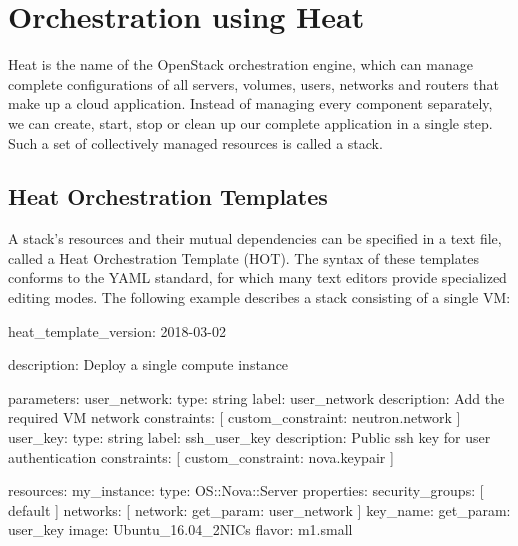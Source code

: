 \chapter{Orchestration using Heat}
\gls{Heat} is the name of the OpenStack orchestration engine, which
can manage complete configurations of all servers, volumes, users,
networks and routers that make up a cloud application.  Instead of
managing every component separately, we can create, start, stop or
clean up our complete application in a single step.  Such a set of
collectively managed resources is called a \gls{stack}.


\section{\gls{Heat Orchestration Template}s}
A \gls{stack}'s resources and their mutual dependencies can be
specified in a text file, called a \gls{Heat Orchestration Template}
(\textsc{HOT}).  The syntax of these templates conforms to the
\gls{YAML} standard, for which many text editors provide specialized
editing modes.  The following example describes a stack consisting of
a single VM:
\begin{code}{}
heat_template_version: 2018-03-02

description: Deploy a single compute instance

parameters:
  user_network:
    type: string
    label: user_network
    description: Add the required VM network
    constraints: [ custom_constraint: neutron.network ]
  user_key:
    type: string
    label: ssh_user_key
    description: Public ssh key for user authentication
    constraints: [ custom_constraint: nova.keypair ]

resources:
  my_instance:
    type: OS::Nova::Server
    properties:
      security_groups: [ default ]
      networks: [ network: { get_param: user_network } ]
      key_name: { get_param: user_key }
      image: Ubuntu_16.04_2NICs
      flavor: m1.small
\end{code}

